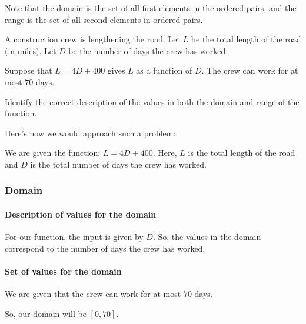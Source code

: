 \begin{note}
  \label{nte:domain_range_pairs}

  Note that the domain is the set of all first elements in the ordered pairs,
  and the range is the set of all second elements in ordered pairs.
\end{note}

\begin{example}
  \label{exm:domain_range}

  A construction crew is lengthening the road. Let $L$ be the total length of
  the road (in miles). Let $D$ be the number of days the crew has worked.

  Suppose that $L = 4D + 400$ gives $L$ as a function of $D$. The crew can work
  for at most $70$ days.

  Identify the correct description of the values in both the domain and range of
  the function.

  Here's how we would approach such a problem:

  We are given the function: $L = 4D + 400$. Here, $L$ is the total length of
  the road and $D$ is the total number of days the crew has worked.

  \subsubsection{Domain}
  \label{sub_sub_sec:domain}

  \paragraph{Description of values for the domain}
  \label{par:description_of_values_for_the_domain}

  For our function, the input is given by $D$.
  So, the values in the domain correspond to the number of days the crew has
  worked.
  

  \paragraph{Set of values for the domain}
  \label{par:set_of_values_for_the_domain}

  We are given that the crew can work for at most $70$ days.
  
  So, our domain will be $[0, 70]$.

  

\end{example}
